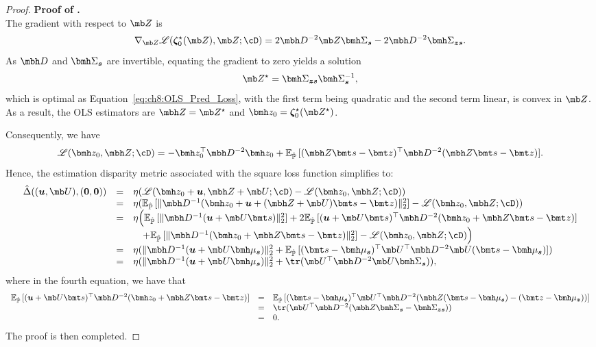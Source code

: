 \documentclass[mnsc, nonblindrev]{informswp}
\newcommand{\1}[1]{\mathds{1}{\left(#1\right)}}
\begin{document}
\begin{appendices}
\begin{proof}{\bf Proof of .}
\begin{equation}
\label{eq:ch8:OLS_Pred_Loss}
\end{equation}
The gradient with respect to $\mb Z$ is 
\[
\nabla_{\mb Z} \mathscr{L}(\bm \zeta_0^\star (\mb Z),\mb Z; \cD) = 2 \mbh D^{-2} \mb Z \bmh \Sigma_{\bm s} - 2 \mbh D^{-2} \bmh \Sigma_{\bm z \bm s}.
\]
As $\mbh D$ and $\bmh \Sigma_{\bm s}$ are invertible, equating the gradient to zero yields a solution 
$$
\mb Z^\star = \bmh \Sigma_{\bm z \bm s} \bmh \Sigma_{\bm s}^{-1},
$$
which is optimal as Equation~\eqref{eq:ch8:OLS_Pred_Loss}, with the first term being quadratic and the second term linear, is convex in $\mb Z$. As a result, the OLS estimators are $\mbh Z = \mb Z^\star$ and $\bmh z_0 = \bm \zeta_0^\star (\mb Z^\star)$.

Consequently, we have
$$
\mathscr{L}(\bmh z_0,\mbh Z; \cD) = - \bmh z_0^\top \mbh D^{-2} \bmh z_0 + \mathbb{E}_{\hat{\mathbb{P}}}\,[(\mbh Z \bmt s - \bmt z)^{\top} \mbh D^{-2} (\mbh Z \bmt s - \bmt z)].
$$
Hence, the estimation disparity metric associated with the square loss function simplifies to:
$$
\begin{array}{rcl}
\hat \Delta ((\bm u, \mb U),(\bm 0,\bm 0))
&=& \eta (\mathscr{L}(\bmh z_0 + \bm u,\mbh Z + \mb U; \cD) - \mathscr{L}(\bmh z_0,\mbh Z; \cD)) \\
&=& \eta (\mathbb{E}_{\hat{\mathbb{P}}}\,[\|\mbh D^{-1} (\bmh z_0  + \bm u + (\mbh Z + \mb U) \bmt s - \bmt z) \|_2^2] - \mathscr{L}(\bmh z_0,\mbh Z; \cD)) \\
&=& \eta \Big(\mathbb{E}_{\hat{\mathbb{P}}}\,[\| \mbh D^{-1} (\bm u + \mb U \bmt s) \|_2^2] + 2 \mathbb{E}_{\hat{\mathbb{P}}}\,[(\bm u + \mb U \bmt s)^\top \mbh D^{-2} (\bmh z_0 + \mbh Z \bmt s - \bmt z)] \\
& & \quad + \mathbb{E}_{\hat{\mathbb{P}}}\,[\| \mbh D^{-1} (\bmh z_0 + \mbh Z \bmt s - \bmt z) \|_2^2] - \mathscr{L}(\bmh z_0,\mbh Z; \cD) \Big) \\
&=& \eta (\|\mbh D^{-1} (\bm u + \mb U \bmh \mu_{\bm s})\|_2^2 + \mathbb{E}_{\hat{\mathbb{P}}}\,[(\bmt s - \bmh \mu_{\bm s})^\top \mb U^\top \mbh D^{-2} \mb U (\bmt s - \bmh \mu_{\bm s})]) \\
&=& \eta (\| \mbh D^{-1} (\bm u + \mb U \bmh \mu_{\bm s})\|_2^2 + \tr(\mb U^\top \mbh D^{-2} \mb U \bmh \Sigma_{\bm s})),
\end{array}
$$
where in the fourth equation, we have that
\[
\begin{array}{rcl}
\mathbb{E}_{\hat{\mathbb{P}}}\,[(\bm u + \mb U \bmt s)^\top \mbh D^{-2} (\bmh z_0 + \mbh Z \bmt s - \bmt z)] 
& = &\mathbb{E}_{\hat{\mathbb{P}}}\,[(\bmt s - \bmh \mu_{\bm s})^\top \mb U^\top \mbh D^{-2} (\mbh Z (\bmt s - \bmh \mu_{\bm s}) - (\bmt z - \bmh \mu_{\bm z}))] \\
& = & \tr(\mb U^\top \mbh D^{-2}(\mbh Z \bmh \Sigma_{\bm s} - \bmh \Sigma_{\bm z \bm s})) \\
& = & 0.
\end{array}
\]
The proof is then completed.
\hfill \Halmos
\end{proof}
\vspace{3mm}


\end{appendices}
\end{document}
